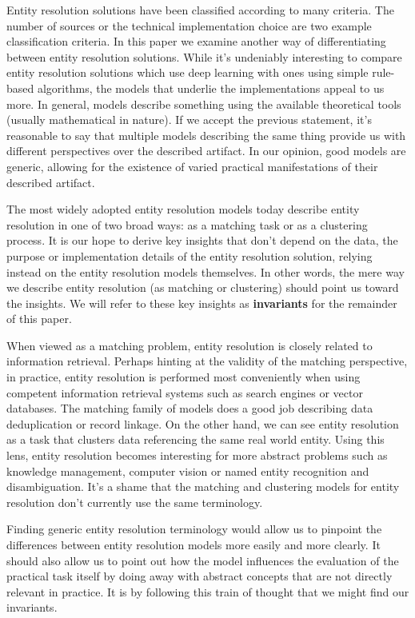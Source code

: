 \documentclass[journal]{IEEEtran}
\begin{document}
    Entity resolution solutions have been classified according to many criteria.
    The number of sources or the technical implementation choice are two example
    classification criteria.
    In this paper we examine another way of differentiating between entity
    resolution solutions.
    While it's undeniably interesting to compare entity resolution solutions
    which use deep learning with ones using simple rule-based algorithms, the
    models that underlie the implementations appeal to us more.
    In general, models describe something using the available theoretical tools
    (usually mathematical in nature).
    If we accept the previous statement, it's reasonable to say that multiple
    models describing the same thing provide us with different perspectives over
    the described artifact.
    In our opinion, good models are generic, allowing for the existence of
    varied practical manifestations of their described artifact.
    
    The most widely adopted entity resolution models today describe entity
    resolution in one of two broad ways: as a matching task or as a clustering
    process.
    It is our hope to derive key insights that don't depend on the data, the
    purpose or implementation details of the entity resolution solution, relying
    instead on the entity resolution models themselves.
    In other words, the mere way we describe entity resolution (as matching or
    clustering) should point us toward the insights.
    We will refer to these key insights as \textbf{invariants} for the remainder
    of this paper.
    
    When viewed as a matching problem, entity resolution is closely related to
    information retrieval.
    Perhaps hinting at the validity of the matching perspective, in practice,
    entity resolution is performed most conveniently when using competent
    information retrieval systems such as search engines or vector databases.
    The matching family of models does a good job describing data deduplication
    or record linkage.
    On the other hand, we can see entity resolution as a task that clusters data
    referencing the same real world entity.
    Using this lens, entity resolution becomes interesting for more abstract
    problems such as knowledge management, computer vision or named entity
    recognition and disambiguation.
    It's a shame that the matching and clustering models for entity resolution
    don't currently use the same terminology.

    Finding generic entity resolution terminology would allow us to pinpoint
    the differences between entity resolution models more easily and more
    clearly.
    It should also allow us to point out how the model influences the evaluation
    of the practical task itself by doing away with abstract concepts that are
    not directly relevant in practice.
    It is by following this train of thought that we might find our invariants.
    
\end{document}

